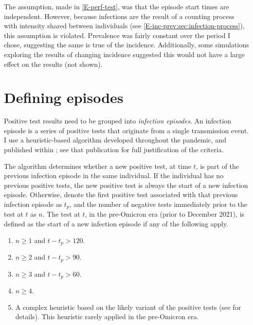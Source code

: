 \documentclass[12pt, letterpaper]{article} %
\begin{document}
The assumption, made in \cref{E-perf-test}, was that the episode start times are independent.
However, because infections are the result of a counting process with intensity shared between individuals (see \cref{E-inc-prev:sec:infection-process}), this assumption is violated.
Prevalence was fairly constant over the period I chose, suggesting the same is true of the incidence.
Additionally, some simulations exploring the results of changing incidence suggested this would not have a large effect on the results (not shown).
\printbibliography[heading=bibintoc]

\appendix

\section{Defining episodes} \label{episodes}


Positive test results need to be grouped into \emph{infection episodes}.
An infection episode is a series of positive tests that originate from a single transmission event.
I use a heuristic-based algorithm developed throughout the pandemic, and published within \textcite{weiRisk}; see that publication for full justification of the criteria.

The algorithm determines whether a new positive test, at time $t$, is part of the previous infection episode in the same individual.
If the individual has no previous positive tests, the new positive test is always the start of a new infection episode.
Otherwise, denote the first positive test associated with that previous infection episode as $t_p$, and the number of negative tests immediately prior to the test at $t$ as $n$.
The test at $t$, in the pre-Omicron era (prior to December 2021), is defined as the start of a new infection episode if any of the following apply.
\begin{enumerate}
  \item $n \geq 1$ and $t - t_p > 120$.
  \item $n \geq 2$ and $t - t_p > 90$.
  \item $n \geq 3$ and $t - t_p > 60$.
  \item $n \geq 4$.
  \item A complex heuristic based on the likely variant of the positive tests (see \textcite{weiRisk} for details). This heuristic rarely applied in the pre-Omicron era.
\end{enumerate}
\end{document}
